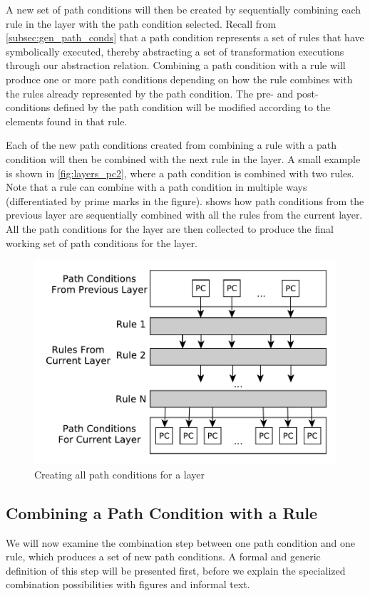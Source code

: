 A new set of path conditions will then be created by sequentially combining each rule in the layer with the path condition selected. Recall from \cref{subsec:gen_path_conds} that a path condition represents a set of rules that have symbolically executed, thereby abstracting a set of transformation executions through our abstraction relation. Combining a path condition with a rule will produce one or more path conditions depending on how the rule combines with the rules already represented by the path condition. The pre- and post- conditions defined by the path condition will be modified according to the elements found in that rule. 

Each of the new path conditions created from combining a rule with a path condition will then be combined with the next rule in the layer. A small example is shown in \cref{fig:layers_pc2}, where a path condition is combined with two rules. Note that a rule can combine with a path condition in multiple ways (differentiated by prime marks in the figure).  shows how path conditions from the previous layer are sequentially combined with all the rules from the current layer. All the path conditions for the layer are then collected to produce the final working set of path conditions for the layer.

        \begin{figure}[bht]
                 \centering
                  \includegraphics[width=.38\textwidth]{./figures/overview/all_pcs.pdf}
                 \caption{Creating all path conditions for a layer}
                 \label{fig:all_pcs2}
         \end{figure}
         
\subsection{Combining a Path Condition with a Rule}
We will now examine the combination step between one path condition and one rule, which produces a set of new path conditions. A formal and generic definition of this step will be presented first, before we explain the specialized combination possibilities with figures and informal text.

